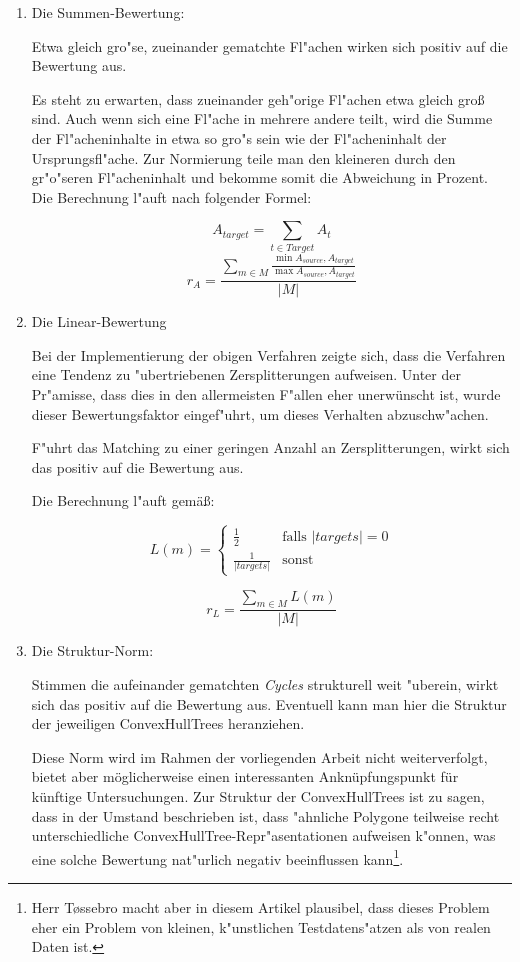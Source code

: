 \begin{enumerate}
\item Die Summen-Bewertung:


Etwa gleich gro"se, zueinander gematchte Fl"achen wirken sich positiv auf die Bewertung aus.

Es steht zu erwarten, dass zueinander geh"orige Fl"achen etwa gleich groß sind. Auch wenn sich eine Fl"ache in mehrere andere teilt, wird die Summe der Fl"acheninhalte in etwa so gro"s sein wie der Fl"acheninhalt der Ursprungsfl"ache. Zur Normierung teile man den kleineren durch den gr"o"seren Fl"acheninhalt und bekomme somit die Abweichung in Prozent. Die Berechnung l"auft nach folgender Formel:

$$A_{target}=\sum_{t\in Target}A_t$$
$$r_A=\frac {\sum_{m\in M}\frac{\min{A_{source},A_{target}}}{\max{A_{source},A_{target}}}}{|M|}$$



\item Die Linear-Bewertung

Bei der Implementierung der obigen Verfahren zeigte sich, dass die Verfahren eine Tendenz zu "ubertriebenen Zersplitterungen aufweisen. Unter der Pr"amisse, dass dies in den allermeisten F"allen eher unerwünscht ist, wurde dieser Bewertungsfaktor eingef"uhrt, um dieses Verhalten abzuschw"achen.

F"uhrt das Matching zu einer geringen Anzahl an Zersplitterungen, wirkt sich das positiv auf die Bewertung aus.

Die Berechnung l"auft gemäß:

$$L(m)=
\begin{cases}
	\frac{1}{2} & \text{falls }|targets|=0\\
	\frac{1}{|targets|} & \text{sonst}
    \end{cases}
$$

$$r_L=\frac{\sum_{m\in M}L(m)}{|M|}$$

\item Die Struktur-Norm:

Stimmen die aufeinander gematchten \textit{Cycles} strukturell weit "uberein, wirkt sich das positiv auf die Bewertung aus. Eventuell kann man hier die Struktur der jeweiligen ConvexHullTrees heranziehen.

Diese Norm wird im Rahmen der vorliegenden Arbeit nicht weiterverfolgt, bietet aber möglicherweise einen interessanten Anknüpfungspunkt für künftige Untersuchungen. Zur Struktur der ConvexHullTrees ist zu sagen, dass in \cite{TG} der Umstand beschrieben ist, dass "ahnliche Polygone teilweise recht unterschiedliche ConvexHullTree-Repr"asentationen aufweisen k"onnen, was eine solche Bewertung nat"urlich negativ beeinflussen kann\footnote{Herr T\o{}ssebro macht aber in diesem Artikel plausibel, dass dieses Problem eher ein Problem von kleinen, k"unstlichen Testdatens"atzen als von realen Daten ist.}.


\end{enumerate} 

